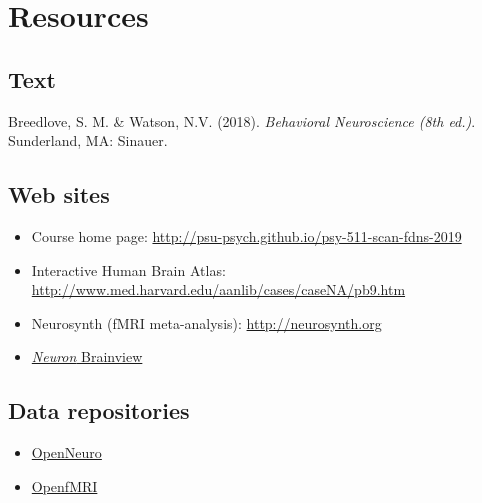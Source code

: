 \documentclass[]{article}
\providecommand{\tightlist}{%
  \setlength{\itemsep}{0pt}\setlength{\parskip}{0pt}}
\begin{document}
\hypertarget{resources}{%
\section{Resources}\label{resources}}

\hypertarget{text}{%
\subsection{Text}\label{text}}

Breedlove, S. M. \& Watson, N.V. (2018). \emph{Behavioral Neuroscience
(8th ed.)}. Sunderland, MA: Sinauer.

\hypertarget{web-sites}{%
\subsection{Web sites}\label{web-sites}}

\begin{itemize}
\tightlist
\item
  Course home page:
  \url{http://psu-psych.github.io/psy-511-scan-fdns-2019}
\item
  Interactive Human Brain Atlas:
  \url{http://www.med.harvard.edu/aanlib/cases/caseNA/pb9.htm}
\item
  Neurosynth (fMRI meta-analysis): \url{http://neurosynth.org}
\item
  \href{http://www.cell.com/neuron/brainview}{\emph{Neuron} Brainview}
\end{itemize}

\hypertarget{data-repositories}{%
\subsection{Data repositories}\label{data-repositories}}

\begin{itemize}
\tightlist
\item
  \href{http://openneuro.org}{OpenNeuro}
\item
  \href{http://openfmri.org}{OpenfMRI}
\end{itemize}
\end{document}
